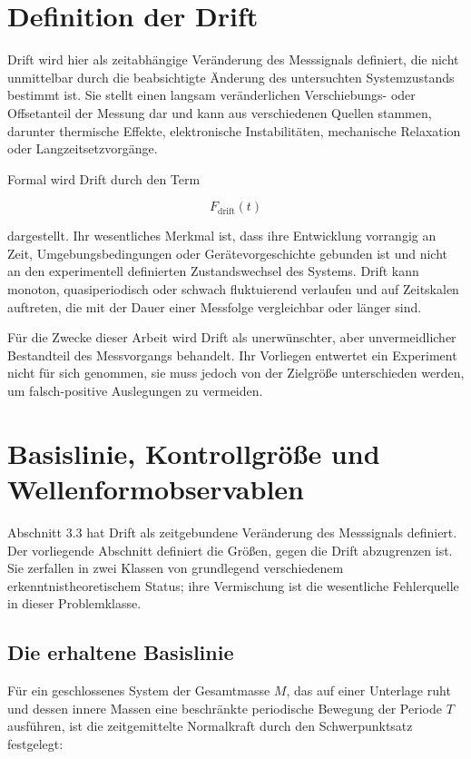\documentclass[12pt,a4paper]{report}
\begin{document}
\section{Definition der Drift}

Drift wird hier als zeitabhängige Veränderung des Messsignals definiert,
die nicht unmittelbar durch die beabsichtigte Änderung des untersuchten
Systemzustands bestimmt ist. Sie stellt einen langsam veränderlichen
Verschiebungs- oder Offsetanteil der Messung dar und kann aus
verschiedenen Quellen stammen, darunter thermische Effekte, elektronische
Instabilitäten, mechanische Relaxation oder Langzeitsetzvorgänge.

Formal wird Drift durch den Term

\begin{equation}
F_{\text{drift}}(t)
\end{equation}

dargestellt. Ihr wesentliches Merkmal ist, dass ihre Entwicklung
vorrangig an Zeit, Umgebungsbedingungen oder Gerätevorgeschichte gebunden
ist und nicht an den experimentell definierten Zustandswechsel des
Systems. Drift kann monoton, quasiperiodisch oder schwach fluktuierend
verlaufen und auf Zeitskalen auftreten, die mit der Dauer einer Messfolge
vergleichbar oder länger sind.

Für die Zwecke dieser Arbeit wird Drift als unerwünschter, aber
unvermeidlicher Bestandteil des Messvorgangs behandelt. Ihr Vorliegen
entwertet ein Experiment nicht für sich genommen, sie muss jedoch von der
Zielgröße unterschieden werden, um falsch-positive Auslegungen zu
vermeiden.

\section{Basislinie, Kontrollgröße und Wellenformobservablen}
\label{sec:baseline-and-observables}

Abschnitt 3.3 hat Drift als zeitgebundene Veränderung des Messsignals
definiert. Der vorliegende Abschnitt definiert die Größen, gegen die
Drift abzugrenzen ist. Sie zerfallen in zwei Klassen von grundlegend
verschiedenem erkenntnistheoretischem Status; ihre Vermischung ist die
wesentliche Fehlerquelle in dieser Problemklasse.

\subsection{Die erhaltene Basislinie}

Für ein geschlossenes System der Gesamtmasse $M$, das auf einer Unterlage
ruht und dessen innere Massen eine beschränkte periodische Bewegung der
Periode $T$ ausführen, ist die zeitgemittelte Normalkraft durch den
Schwerpunktsatz festgelegt:
\end{document}
